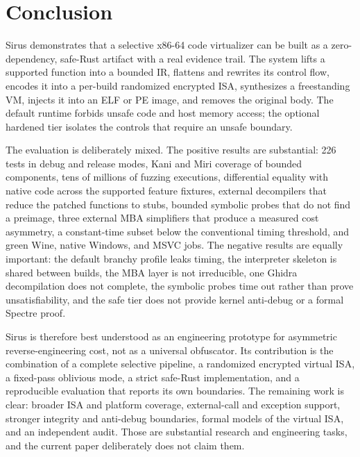 \section{Conclusion}
\label{sec:conclusion}

Sirus demonstrates that a selective x86-64 code virtualizer can be built as a
zero-dependency, safe-Rust artifact with a real evidence trail. The system lifts
a supported function into a bounded IR, flattens and rewrites its control flow,
encodes it into a per-build randomized encrypted ISA, synthesizes a freestanding
 VM, injects it into an ELF or PE image, and removes the original
body. The default runtime forbids unsafe code and host memory access; the
optional hardened tier isolates the controls that require an unsafe boundary.

The evaluation is deliberately mixed. The positive results are substantial: 226
tests in debug and release modes, Kani and Miri coverage of bounded components,
tens of millions of fuzzing executions, differential equality with native code
across the supported feature fixtures, external decompilers that reduce the
patched functions to stubs, bounded symbolic probes that do not find a preimage,
three external MBA simplifiers that produce a measured cost asymmetry, a
constant-time subset below the conventional timing threshold, and green Wine,
native Windows, and MSVC  jobs. The negative results are equally
important: the default branchy profile leaks timing, the interpreter skeleton is
shared between builds, the MBA layer is not irreducible, one Ghidra decompilation
does not complete, the symbolic probes time out rather than prove
unsatisfiability, and the safe tier does not provide kernel anti-debug or a
formal Spectre proof.

Sirus is therefore best understood as an engineering prototype for asymmetric
reverse-engineering cost, not as a universal obfuscator. Its contribution is the
combination of a complete selective pipeline, a randomized encrypted virtual ISA,
a fixed-pass oblivious mode, a strict safe-Rust implementation, and a
reproducible evaluation that reports its own boundaries. The remaining work is
clear: broader ISA and platform coverage, external-call and exception support,
stronger integrity and anti-debug boundaries, formal models of the virtual ISA,
and an independent audit. Those are substantial research and engineering tasks,
and the current paper deliberately does not claim them.

